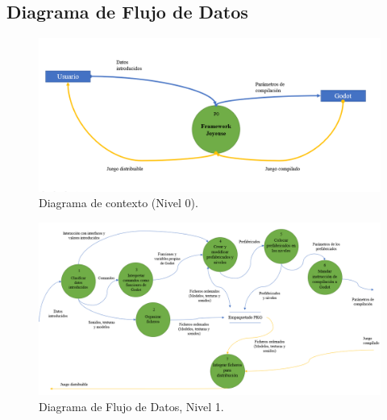 \documentclass[]{article}
\begin{document}
\subsection{Diagrama de Flujo de Datos}
\begin{figure}[H]
	
	\centering
	\includegraphics[width=1\textwidth]{DFD}
	\caption{Diagrama de contexto (Nivel 0).} 
	\label{DFD0}
	
\end{figure}
\begin{figure}[H]
	
	\centering
	\includegraphics[width=1\textwidth]{DFD2}
	\caption{Diagrama de Flujo de Datos, Nivel 1.} 
	\label{DFD1}
	
\end{figure}




  



\newpage


\end{document}
